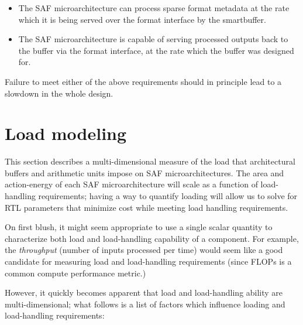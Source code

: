 \begin{itemize}
    \item The SAF microarchitecture can process sparse format metadata at the rate which it is being served over the format interface by the smartbuffer.
    \item The SAF microarchitecture is capable of serving processed outputs back to the buffer via the format interface, at the rate which the buffer was designed for.
\end{itemize}

Failure to meet either of the above requirements should in principle lead to a slowdown in the whole design.

\section{Load modeling}

This section describes a multi-dimensional measure of the load that architectural buffers and arithmetic units impose on SAF microarchitectures. The area and action-energy of each SAF microarchitecture will scale as a function of load-handling requirements; having a way to quantify loading will allow us to solve for RTL parameters that minimize cost while meeting load handling requirements.

On first blush, it might seem appropriate to use a single scalar quantity to characterize both load and load-handling capability of a component. For example, the \textit{throughput} (number of inputs processed per time) would seem like a good candidate for measuring load and load-handling requirements (since FLOPs is a common compute performance metric.)

However, it quickly becomes apparent that load and load-handling ability are multi-dimensional; what follows is a list of factors which influence loading and load-handling requirements:

